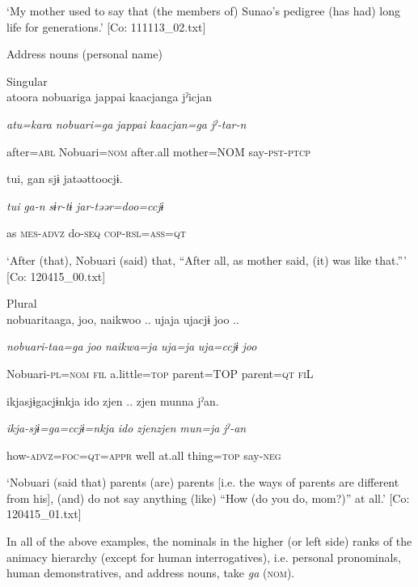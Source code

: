 \glt ‘My mother used to say that (the members of) Sunao’s pedigree (has had) long life for generations.’ [Co: 111113\_02.txt]
\z

  Address nouns (personal name)

\ex  Singular\\

{\TM}
\gll atoora  nobuariga  jappai  {\textbar}kaacjan{\textbar}ga  jˀicjan

      \textit{atu=kara}  \textit{nobuari=ga}  \textit{jappai}  \textit{kaacjan=ga}  \textit{jˀ-tar-n}

      after=\textsc{abl}  Nobuari=\textsc{nom}  after.all  mother=NOM  say-\textsc{pst}-\textsc{ptcp}

      tui,  gan  sjɨ  jatəəttoocjɨ.

      \textit{tui}  \textit{ga-n}  \textit{sɨr-tɨ}  \textit{jar-təər=doo=ccjɨ}

      as  \textsc{mes}-\textsc{advz}  do-\textsc{seq}  \textsc{cop}-\textsc{rsl}=\textsc{ass}=\textsc{qt}

\glt ‘After (that), Nobuari (said) that, “After all, as mother said, (it) was like that.”’ [Co: 120415\_00.txt]
\z

\ex  Plural\\

{\TM}
\gll nobuaritaaga,  joo,  naikwoo ..  ujaja  ujacjɨ  joo ..

      \textit{nobuari-taa=ga}  \textit{joo}  \textit{naikwa=ja}  \textit{uja=ja}  \textit{uja=ccjɨ}  \textit{joo}

      Nobuari-\textsc{pl}=\textsc{nom}  \textsc{fil}  a.little=\textsc{top}  parent=TOP  parent=\textsc{qt}  \textsc{fi}L

      ikjasjɨgacjɨnkja  ido  zjen .. zjen  munna  jˀan.

      \textit{ikja-sjɨ=ga=ccjɨ=nkja}  \textit{ido}  \textit{zjenzjen}  \textit{mun=ja}  \textit{jˀ-an}

      how-\textsc{advz}=\textsc{foc}=\textsc{qt}=\textsc{appr}  well  at.all  thing=\textsc{top}  say-\textsc{neg}

\glt ‘Nobuari (said that) parents (are) parents [i.e. the ways of parents are different from his], (and) do not say anything (like) “How (do you do, mom?)” at all.’ [Co: 120415\_01.txt]
\z

In all of the above examples, the nominals in the higher (or left side) ranks of the animacy hierarchy (except for human interrogatives), i.e. personal pronominals, human demonstratives, and address nouns, take \textit{ga} (\textsc{nom}).

